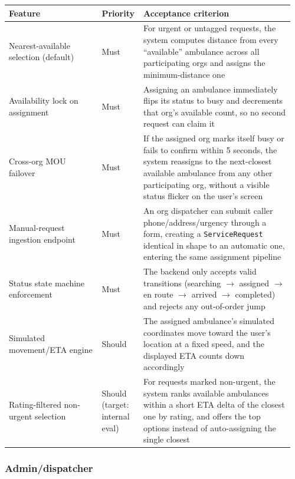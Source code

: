 \documentclass[11pt,a4paper]{article}
\begin{document}
\begin{longtable}{p{0.32\linewidth} p{0.12\linewidth} p{0.52\linewidth}}
\toprule
\textbf{Feature} & \textbf{Priority} & \textbf{Acceptance criterion} \\
\midrule
\endhead
Nearest-available selection (default) & Must & For urgent or untagged requests, the system computes distance from every ``available'' ambulance across all participating orgs and assigns the minimum-distance one \\
\addlinespace
Availability lock on assignment & Must & Assigning an ambulance immediately flips its status to busy and decrements that org's available count, so no second request can claim it \\
\addlinespace
Cross-org MOU failover & Must & If the assigned org marks itself busy or fails to confirm within 5 seconds, the system reassigns to the next-closest available ambulance from any other participating org, without a visible status flicker on the user's screen \\
\addlinespace
Manual-request ingestion endpoint & Must & An org dispatcher can submit caller phone/address/urgency through a form, creating a \texttt{ServiceRequest} identical in shape to an automatic one, entering the same assignment pipeline \\
\addlinespace
Status state machine enforcement & Must & The backend only accepts valid transitions (searching $\rightarrow$ assigned $\rightarrow$ en route $\rightarrow$ arrived $\rightarrow$ completed) and rejects any out-of-order jump \\
\addlinespace
Simulated movement/ETA engine & Should & The assigned ambulance's simulated coordinates move toward the user's location at a fixed speed, and the displayed ETA counts down accordingly \\
\addlinespace
Rating-filtered non-urgent selection & Should (target: internal eval) & For requests marked non-urgent, the system ranks available ambulances within a short ETA delta of the closest one by rating, and offers the top options instead of auto-assigning the single closest \\
\bottomrule
\end{longtable}

\subsubsection{Admin/dispatcher}
\end{document}
